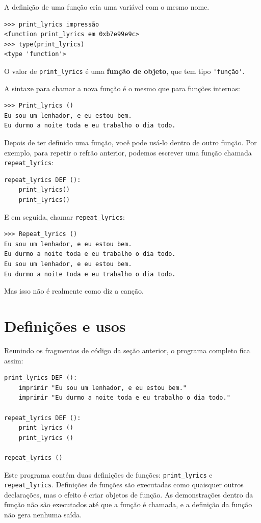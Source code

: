 \documentclass[10pt]{book}
\begin{document}
\begin{exercise}
A definição de uma função cria uma variável com o mesmo nome.

\begin{verbatim}
>>> print_lyrics impressão
<function print_lyrics em 0xb7e99e9c>
>>> type(print_lyrics)
<type 'function'>
\end{verbatim}
%
O valor de \verb "print_lyrics" é uma {\bf função de objeto}, que
tem tipo \verb "'função'".

A sintaxe para chamar a nova função é o mesmo que
para funções internas:

\begin{verbatim}
>>> Print_lyrics ()
Eu sou um lenhador, e eu estou bem.
Eu durmo a noite toda e eu trabalho o dia todo.
\end{verbatim}
%
Depois de ter definido uma função, você pode usá-lo dentro de outro
função. Por exemplo, para repetir o refrão anterior, podemos escrever
uma função chamada \verb "repeat_lyrics":

\begin{verbatim}
repeat_lyrics DEF ():
    print_lyrics()
    print_lyrics()
\end{verbatim}
%
E em seguida, chamar \verb "repeat_lyrics":

\begin{verbatim}
>>> Repeat_lyrics ()
Eu sou um lenhador, e eu estou bem.
Eu durmo a noite toda e eu trabalho o dia todo.
Eu sou um lenhador, e eu estou bem.
Eu durmo a noite toda e eu trabalho o dia todo.
\end{verbatim}
%
Mas isso não é realmente como diz a canção.


\section{Definições e usos}

Reunindo os fragmentos de código da seção anterior, o
programa completo fica assim:

\begin{verbatim}
print_lyrics DEF ():
    imprimir "Eu sou um lenhador, e eu estou bem."
    imprimir "Eu durmo a noite toda e eu trabalho o dia todo."

repeat_lyrics DEF ():
    print_lyrics ()
    print_lyrics ()

repeat_lyrics ()
\end{verbatim}
%
Este programa contém duas definições de funções: \verb "print_lyrics" e
\verb "repeat_lyrics". Definições de funções são executadas como quaisquer outros
declarações, mas o efeito é criar objetos de função. As demonstrações
dentro da função não são executados até que a função é chamada, e
a definição da função não gera nenhuma saída.


\end{exercise}
\end{document}
